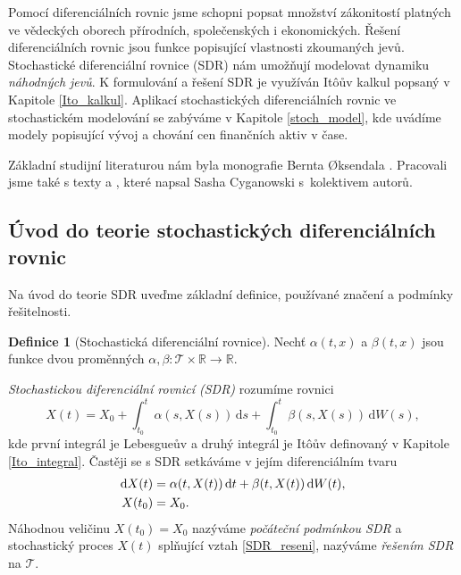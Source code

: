 \documentclass[a4paper,12pt]{report}
\theoremstyle{definition} \newtheorem{definice}[veta]{Definice}
\theoremstyle{remark}
\begin{document}
Pomocí diferenciálních rovnic jsme schopni popsat množství zákonitostí platných ve vědeckých oborech přírodních, společenských i ekonomických.
Řešení diferenciálních rovnic jsou funkce popisující vlastnosti zkoumaných jevů.
Stochastické diferenciální rovnice (SDR) nám umožňují modelovat dynamiku \textit{náhodných jevů}.
K formulování a řešení SDR je využíván It\^oův kalkul popsaný v Kapitole \ref{Ito_kalkul}.
Aplikací stochastických diferenciálních rovnic ve stochastickém modelování se zabýváme v Kapitole \ref{stoch_model}, kde uvádíme modely popisující vývoj a chování cen finančních aktiv v čase.

Základní studijní literaturou nám byla monografie Bernta {\O}ksendala \cite{oksendal2003stochastic}.
Pracovali jsme také s texty \cite{cyganowski1998maple} a \cite{cyganowski2002elementary}, které napsal Sasha Cyganowski s~kolektivem autorů.

\subsection{Úvod do teorie stochastických diferenciálních rovnic}\label{SDR_kap}
Na úvod do teorie SDR uveďme základní definice, používané značení a podmínky řešitelnosti.
\begin{definice}[Stochastická diferenciální rovnice]
Nechť $\alpha(t,x)$ a $\beta(t,x)$ jsou funkce dvou proměnných $\alpha,\beta:\mathcal{T}\times\mathbb{R}\to\mathbb{R}$.

\textit{Stochastickou diferenciální rovnicí (SDR)} rozumíme rovnici
\begin{equation}\label{SDR_reseni}
X(t)=X_0+\int_{t_0}^t\alpha(s,X(s))\,\mathrm{d}s+\int_{t_0}^t\beta(s,X(s))\,\mathrm{d}W(s),
\end{equation}
kde první integrál je Lebesgueův a druhý integrál je It\^oův definovaný v Kapitole \ref{Ito_integral}.
Častěji se s SDR setkáváme v jejím diferenciálním tvaru
\begin{align}\label{SDR_def}
\mathrm{d}X(t)&=\alpha(t,X(t))\,\mathrm{d}t+\beta(t,X(t))\,\mathrm{d}W(t),\\%
X(t_0)&=X_0.\notag
\end{align}
Náhodnou veličinu $X(t_0)=X_0$ nazýváme \textit{počáteční podmínkou SDR} a stochastický proces $X(t)$ splňující vztah \eqref{SDR_reseni}, nazýváme \textit{řešením SDR} na $\mathcal{T}$.
\end{definice}
\end{document}
